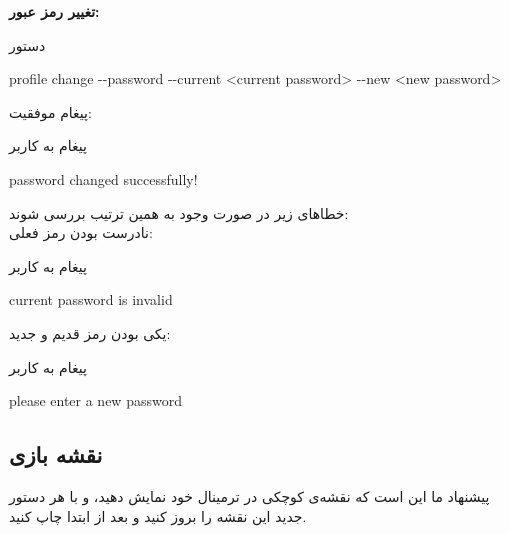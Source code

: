 \documentclass[]{article}
\begin{document}
\vspace{.5cm}
\textbf{تغییر رمز عبور:}
\begin{mybox}[colback=yellow]{دستور}
	\begin{latin}	
		profile change -{}-password -{}-current <current password> -{}-new <new 
		password>
	\end{latin}
\end{mybox}
پیغام موفقیت:
\begin{mybox}[colback=yellow]{پیغام به کاربر}
	\begin{latin}	
		password changed successfully!
	\end{latin}
\end{mybox}
خطا‌های زیر در صورت وجود به همین ترتیب بررسی شوند:
\\
نادرست بودن رمز فعلی:
\begin{mybox}[colback=yellow]{پیغام به کاربر}
	\begin{latin}	
		current password is invalid
	\end{latin}
\end{mybox}
یکی بودن رمز قدیم و جدید:
\begin{mybox}[colback=yellow]{پیغام به کاربر}
	\begin{latin}	
		please enter a new password
	\end{latin}
\end{mybox}

\newpage 
\subsection*{{\titr نقشه بازی}}
پیشنهاد ما این است که نقشه‌ی کوچکی در ترمینال خود نمایش دهید، و با هر دستور جدید این نقشه را بروز کنید و بعد از ابتدا چاپ کنید.
\end{document}
